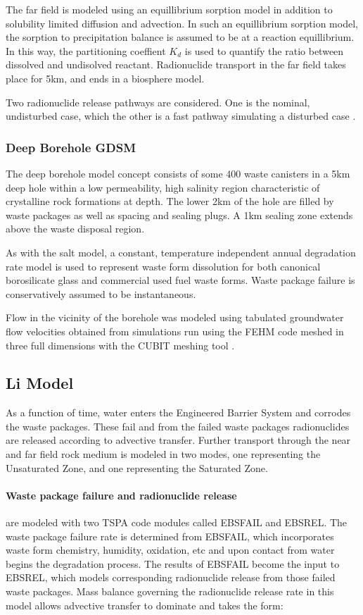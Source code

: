 {The far field is modeled using an equillibrium sorption model in addition 
to solubility limited diffusion and advection. In such an equillibrium sorption 
model, the sorption to precipitation balance is assumed to be at a 
reaction equillibrium. In this way, the partitioning coeffient $K_d$ is used to 
quantify the ratio between dissolved and undisolved reactant. Radionuclide transport
in the far field takes place for 5km, and ends in a biosphere model. 

Two radionuclide release pathways are considered. One is the nominal, undisturbed 
case, which the other is a fast pathway simulating a disturbed case
\cite{clayton_generic_2011}.


\subsubsection{ Deep Borehole GDSM}

The deep borehole model concept consists of some 400 waste canisters in a 5km 
deep hole within a low permeability, high salinity region characteristic of 
crystalline rock formations at depth. The lower 2km of the hole are filled 
by waste packages as well as spacing and sealing plugs. A 1km sealing zone 
extends above the waste disposal region.

As with the salt model, a constant, temperature independent annual degradation
rate model is used to represent waste form dissolution for both canonical 
borosilicate glass and commercial used fuel waste forms. Waste package failure 
is conservatively assumed to be instantaneous.

Flow in the vicinity of the borehole was modeled using tabulated groundwater 
flow velocities obtained from simulations run using the \gls{FEHM} code 
meshed in three full dimensions with the \gls{CUBIT} meshing tool 
\cite{clayton_generic_2011}.
\subsection{Li Model\cite{li_methodology_2006}} As a function of time, water
enters the Engineered Barrier System and corrodes the waste packages.  These
fail and from the failed waste packages radionuclides are released according to
advective transfer.  Further transport through the near and far field rock
medium is modeled in two modes, one representing the Unsaturated Zone, and one
representing the Saturated Zone.

\paragraph{Waste package failure and radionuclide release} are modeled with two TSPA
code modules called EBSFAIL and EBSREL. The waste package failure rate is
determined from EBSFAIL, which incorporates waste form chemistry, humidity,
oxidation, etc and upon contact from water begins the degradation process. The
results of EBSFAIL become the input to EBSREL, which models corresponding
radionuclide release from those failed waste packages. Mass balance governing the
radionuclide release rate in this model allows advective transfer to dominate and
takes the form:

}
